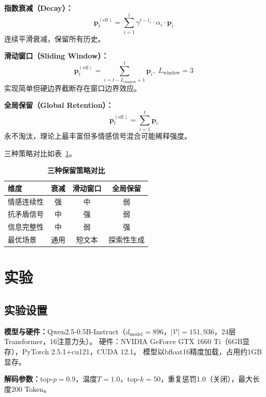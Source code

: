 \documentclass[a4paper, 11pt]{article}
\begin{document}
\textbf{指数衰减（Decay）：}
\begin{equation}
  \bm{p}_t^{(\text{eff})}=\sum_{i=1}^{t}\gamma^{t-t_i}\cdot\alpha_i\cdot\bm{p}_i
\end{equation}
连续平滑衰减，保留所有历史。

\textbf{滑动窗口（Sliding Window）：}
\begin{equation}
  \bm{p}_t^{(\text{eff})}=\sum_{i=t-L_{\text{window}}+1}^{t}\bm{p}_i,\;L_{\text{window}}=3
\end{equation}
实现简单但硬边界截断存在窗口边界效应。

\textbf{全局保留（Global Retention）：}
\begin{equation}
  \bm{p}_t^{(\text{eff})}=\sum_{i=1}^{t}\bm{p}_i
\end{equation}
永不淘汰，理论上最丰富但多情感信号混合可能稀释强度。

三种策略对比如表~\ref{tab:strategy_compare}。

\begin{table}[ht]
  \centering\caption{\textbf{三种保留策略对比}}\label{tab:strategy_compare}\small
  \begin{tabular}{lccc}\toprule
    维度 & 衰减 & 滑动窗口 & 全局保留\\\midrule
    情感连续性 & 强 & 中 & 弱\\
    抗矛盾信号 & 中 & 强 & 弱\\
    信息完整性 & 中 & 弱 & 强\\
    最优场景 & 通用 & 短文本 & 探索性生成\\\bottomrule
  \end{tabular}
\end{table}


\section{实验}

\subsection{实验设置}

\textbf{模型与硬件：}Qwen2.5-0.5B-Instruct（$d_{\text{model}}=896$，$|\mathcal{V}|=151{,}936$，24层Transformer，16注意力头）。
硬件：NVIDIA GeForce GTX 1660 Ti（6GB显存），PyTorch 2.5.1+cu121，CUDA 12.1。
模型以bfloat16精度加载，占用约1GB显存。

\textbf{解码参数：}top-$p=0.9$，温度$T=1.0$，top-$k=50$，重复惩罚1.0（关闭），最大长度200 Token。
\end{document}
